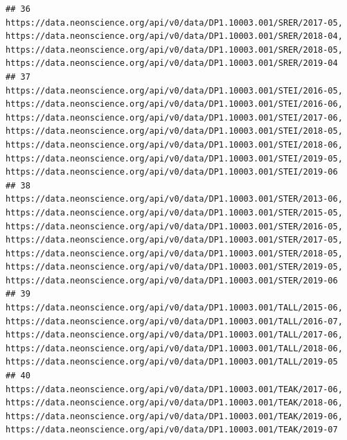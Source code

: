 \documentclass[]{book}
\begin{document}
\begin{verbatim}
## 36                                                                                                                                                                                                                                                                                                                                                          https://data.neonscience.org/api/v0/data/DP1.10003.001/SRER/2017-05, https://data.neonscience.org/api/v0/data/DP1.10003.001/SRER/2018-04, https://data.neonscience.org/api/v0/data/DP1.10003.001/SRER/2018-05, https://data.neonscience.org/api/v0/data/DP1.10003.001/SRER/2019-04
## 37                                                                                                                                           https://data.neonscience.org/api/v0/data/DP1.10003.001/STEI/2016-05, https://data.neonscience.org/api/v0/data/DP1.10003.001/STEI/2016-06, https://data.neonscience.org/api/v0/data/DP1.10003.001/STEI/2017-06, https://data.neonscience.org/api/v0/data/DP1.10003.001/STEI/2018-05, https://data.neonscience.org/api/v0/data/DP1.10003.001/STEI/2018-06, https://data.neonscience.org/api/v0/data/DP1.10003.001/STEI/2019-05, https://data.neonscience.org/api/v0/data/DP1.10003.001/STEI/2019-06
## 38                                                                                                                                           https://data.neonscience.org/api/v0/data/DP1.10003.001/STER/2013-06, https://data.neonscience.org/api/v0/data/DP1.10003.001/STER/2015-05, https://data.neonscience.org/api/v0/data/DP1.10003.001/STER/2016-05, https://data.neonscience.org/api/v0/data/DP1.10003.001/STER/2017-05, https://data.neonscience.org/api/v0/data/DP1.10003.001/STER/2018-05, https://data.neonscience.org/api/v0/data/DP1.10003.001/STER/2019-05, https://data.neonscience.org/api/v0/data/DP1.10003.001/STER/2019-06
## 39                                                                                                                                                                                                                                                                                     https://data.neonscience.org/api/v0/data/DP1.10003.001/TALL/2015-06, https://data.neonscience.org/api/v0/data/DP1.10003.001/TALL/2016-07, https://data.neonscience.org/api/v0/data/DP1.10003.001/TALL/2017-06, https://data.neonscience.org/api/v0/data/DP1.10003.001/TALL/2018-06, https://data.neonscience.org/api/v0/data/DP1.10003.001/TALL/2019-05
## 40                                                                                                                                                                                                                                                                                                                                                          https://data.neonscience.org/api/v0/data/DP1.10003.001/TEAK/2017-06, https://data.neonscience.org/api/v0/data/DP1.10003.001/TEAK/2018-06, https://data.neonscience.org/api/v0/data/DP1.10003.001/TEAK/2019-06, https://data.neonscience.org/api/v0/data/DP1.10003.001/TEAK/2019-07

\end{verbatim}
\end{document}
